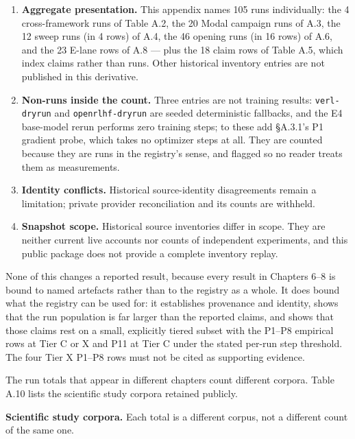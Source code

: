 \documentclass[12pt,a4paper]{report}
\begin{document}
\begin{enumerate}
\def\labelenumi{\arabic{enumi}.}
\item
  \textbf{Aggregate presentation.} This appendix names 105 runs
  individually: the 4 cross-framework runs of Table A.2, the 20 Modal
  campaign runs of A.3, the 12 sweep runs (in 4 rows) of A.4, the 46
  opening runs (in 16 rows) of A.6, and the 23 E-lane rows of A.8 ---
  plus the 18 claim rows of Table A.5, which index claims rather than
  runs. Other historical inventory entries are not published in this
  derivative.
\item
  \textbf{Non-runs inside the count.} Three entries are not training
  results: \texttt{verl-dryrun} and \texttt{openrlhf-dryrun} are seeded
  deterministic fallbacks, and the E4 base-model rerun performs zero
  training steps; to these add §A.3.1's P1 gradient probe, which takes
  no optimizer steps at all. They are counted because they are runs in
  the registry's sense, and flagged so no reader treats them as
  measurements.
\item
  \textbf{Identity conflicts.} Historical source-identity disagreements
  remain a limitation; private provider reconciliation and its counts
  are withheld.
\item
  \textbf{Snapshot scope.} Historical source inventories differ in
  scope. They are neither current live accounts nor counts of
  independent experiments, and this public package does not provide a
  complete inventory replay.
\end{enumerate}

None of this changes a reported result, because every result in Chapters
6--8 is bound to named artefacts rather than to the registry as a whole.
It does bound what the registry can be used for: it establishes
provenance and identity, shows that the run population is far larger
than the reported claims, and shows that those claims rest on a small,
explicitly tiered subset with the P1--P8 empirical rows at Tier C or X
and P11 at Tier C under the stated per-run step threshold. The four Tier
X P1--P8 rows must not be cited as supporting evidence.

The run totals that appear in different chapters count different
corpora. Table A.10 lists the scientific study corpora retained
publicly.

\textbf{Scientific study corpora.} Each total is a different corpus, not
a different count of the same one.
\end{document}
